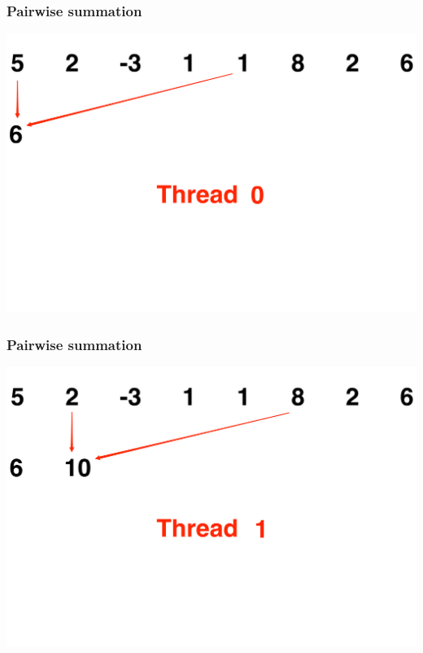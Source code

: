 \documentclass[handout]{beamer}
\numberwithin{equation}{section}
\begin{document}
\begin{frame}
\frametitle{Pairwise summation}
\includegraphics[scale=.15]{../../fig/psum1.pdf}
\end{frame}

\begin{frame}
\frametitle{Pairwise summation}
\includegraphics[scale=.15]{../../fig/psum2.pdf}
\end{frame}
\end{document}
